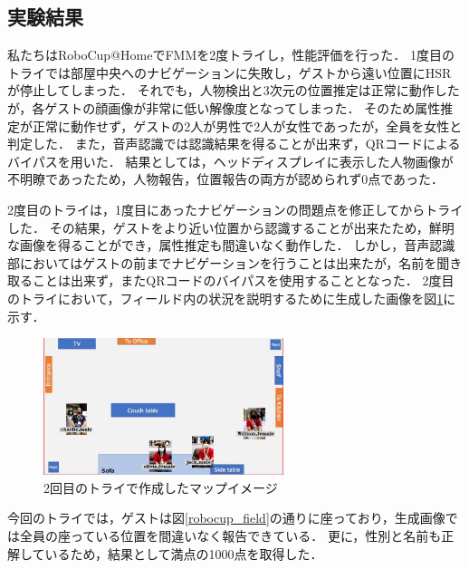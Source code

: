 \documentclass[a4j]{jarticle}
\begin{document}
\subsection{実験結果}
私たちはRoboCup@HomeでFMMを2度トライし，性能評価を行った．
1度目のトライでは部屋中央へのナビゲーションに失敗し，ゲストから遠い位置にHSRが停止してしまった．
それでも，人物検出と3次元の位置推定は正常に動作したが，各ゲストの顔画像が非常に低い解像度となってしまった．
そのため属性推定が正常に動作せず，ゲストの2人が男性で2人が女性であったが，全員を女性と判定した．
また，音声認識では認識結果を得ることが出来ず，QRコードによるバイパスを用いた．
結果としては，ヘッドディスプレイに表示した人物画像が不明瞭であったため，人物報告，位置報告の両方が認められず0点であった．

2度目のトライは，1度目にあったナビゲーションの問題点を修正してからトライした．
その結果，ゲストをより近い位置から認識することが出来たため，鮮明な画像を得ることができ，属性推定も間違いなく動作した．
しかし，音声認識部においてはゲストの前までナビゲーションを行うことは出来たが，名前を聞き取ることは出来ず，またQRコードのバイパスを使用することとなった．
2度目のトライにおいて，フィールド内の状況を説明するために生成した画像を図\ref{result_FMM_2}に示す．
\begin{figure}[ht]
  \centering
  \includegraphics[width=7cm]{images/FMM/mapimage.png}
  \caption{2回目のトライで作成したマップイメージ}
  \label{result_FMM_2}
\end{figure}
今回のトライでは，ゲストは図\ref{robocup_field}の通りに座っており，生成画像では全員の座っている位置を間違いなく報告できている．
更に，性別と名前も正解しているため，結果として満点の1000点を取得した．
\end{document}

